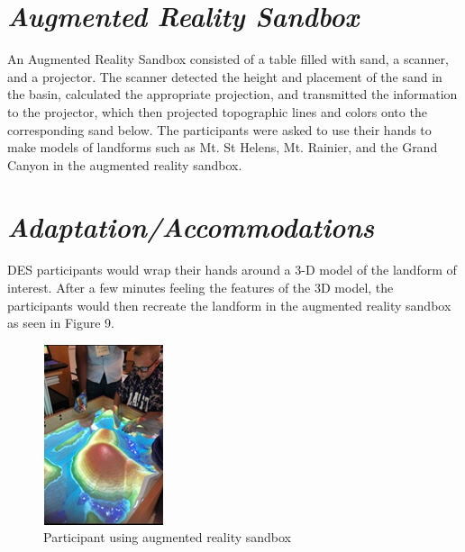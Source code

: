 \documentclass[11.5pt]{sig-alternate}
\begin{document}
\begin{large}
\section*{\textit{Augmented Reality Sandbox}}
An Augmented Reality Sandbox consisted of a table filled with sand, a scanner, and a projector. The scanner detected the height and placement of the sand in the basin, calculated the appropriate projection, and transmitted the information to the projector, which then projected topographic lines and colors onto the corresponding sand below. The participants were asked to use their hands to make models of landforms such as Mt. St Helens, Mt. Rainier, and the Grand Canyon in the augmented reality sandbox.  
\newpage
\section*{\textit{Adaptation/Accommodations}}
 DES participants would wrap their hands around a 3-D model of the landform of interest. After a few minutes feeling the features of the 3D model, the participants would then recreate the landform in the augmented reality sandbox as seen in Figure 9.  

\begin{figure}[h] 
  \renewcommand{\thefigure}{9}
    \centering
    \includegraphics[width=\columnwidth]{figure9.png}
    \caption{Participant using augmented reality sandbox }
    \label{ Participant using augmented reality sandbox }
\end{figure}
 

\end{large}
\end{document}
